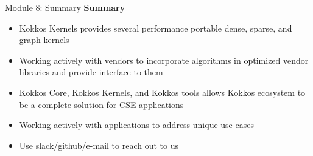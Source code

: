 






\begin{frame}[fragile]{Module 8: Summary}
  \textbf{Summary}
	\begin{itemize}
    \item Kokkos Kernels provides several performance portable dense, sparse, and graph kernels
    \item Working actively with vendors to incorporate algorithms in optimized vendor libraries and provide interface to them
    \item Kokkos Core, Kokkos Kernels, and Kokkos tools allows Kokkos ecosystem to be a complete solution for CSE applications
    \item Working actively with applications to address unique use cases
    \item Use slack/github/e-mail to reach out to us
	\end{itemize}
\end{frame}




